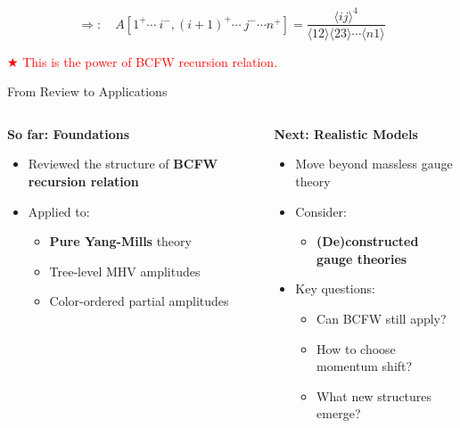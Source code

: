 \documentclass{beamer}
\newcommand{\avg}[1]{\langle #1 \rangle}
\begin{document}
\begin{frame}
\begin{center}
\begin{tikzpicture}[x=0.75pt,y=0.75pt,yscale=-1,xscale=1]
\end{tikzpicture}
\end{center}  
 

\pause
\begin{equation*}
    \boxed{\Rightarrow:\quad A[1^+\cdots ~i^-,(i+1)^+\cdots~j^-\cdots n^+]=\frac{\avg{ij}^4}{\avg{12}\!\avg{23}\cdots\avg{n1}}}
\end{equation*}

\vspace*{2em}
\textcolor{red}{$\bigstar$ \Large This is the power of BCFW recursion relation.}
\end{frame}
\begin{frame}{From Review to Applications}

\begin{columns}[T]
  \begin{column}{0.48\textwidth}
    \begin{block}{\centering\large \textbf{So far: Foundations}}
      \begin{itemize}[left=1em]
        \item Reviewed the structure of \textbf{BCFW recursion relation}
        \item Applied to:
          \begin{itemize}[left=0.1em]
            \item \textbf{Pure Yang-Mills} theory
            \item Tree-level MHV amplitudes
            \item Color-ordered partial amplitudes
          \end{itemize}
      \end{itemize}
    \end{block}
  \end{column}
\pause
  \begin{column}{0.48\textwidth}
    \begin{block}{\centering\large \textbf{Next: Realistic Models}}
      \begin{itemize}[left=1em]
        \item Move beyond massless gauge theory
        \item Consider:
          \begin{itemize}[left=0.1em]
            \item \textbf{(De)constructed gauge theories}
          \end{itemize}
        \item Key questions:
          \begin{itemize}[left=0.1em]
            \item Can BCFW still apply?
            \item How to choose momentum shift?
            \item What new structures emerge?
          \end{itemize}
      \end{itemize}
    \end{block}
  \end{column}
\end{columns}


\end{frame}
\end{document}

